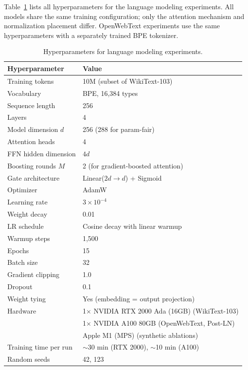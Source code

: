 \documentclass{article}
\theoremstyle{definition}
\begin{document}
Table~\ref{tab:hyperparams} lists all hyperparameters for the language modeling experiments.
All models share the same training configuration; only the attention mechanism and normalization placement differ.
OpenWebText experiments use the same hyperparameters with a separately trained BPE tokenizer.

\begin{table}[h]
\centering
\caption{Hyperparameters for language modeling experiments.}
\label{tab:hyperparams}
\begin{tabular}{@{}ll@{}}
\toprule
\textbf{Hyperparameter} & \textbf{Value} \\
\midrule
Training tokens & 10M (subset of WikiText-103) \\
Vocabulary & BPE, 16,384 types \\
Sequence length & 256 \\
Layers & 4 \\
Model dimension $d$ & 256 (288 for param-fair) \\
Attention heads & 4 \\
FFN hidden dimension & $4d$ \\
Boosting rounds $M$ & 2 (for gradient-boosted attention) \\
Gate architecture & Linear($2d \to d$) + Sigmoid \\
\midrule
Optimizer & AdamW \\
Learning rate & $3 \times 10^{-4}$ \\
Weight decay & 0.01 \\
LR schedule & Cosine decay with linear warmup \\
Warmup steps & 1,500 \\
Epochs & 15 \\
Batch size & 32 \\
Gradient clipping & 1.0 \\
Dropout & 0.1 \\
Weight tying & Yes (embedding = output projection) \\
\midrule
Hardware & 1$\times$ NVIDIA RTX 2000 Ada (16GB) (WikiText-103) \\
 & 1$\times$ NVIDIA A100 80GB (OpenWebText, Post-LN) \\
 & Apple M1 (MPS) (synthetic ablations) \\
Training time per run & ${\sim}$30 min (RTX 2000), ${\sim}$10 min (A100) \\
Random seeds & 42, 123 \\
\bottomrule
\end{tabular}
\end{table}
\end{document}
